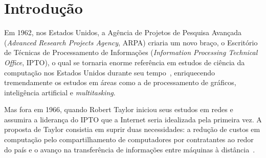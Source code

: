 \documentclass[conference]{IEEEtran}
\begin{document}

\section{Introdução}
  Em 1962, nos Estados Unidos, a Agência de Projetos de Pesquisa Avançada (\emph{Advanced Research Projects Agency}, ARPA) criaria um novo
  braço, o Escritório de Técnicas de Processamento de Informações
  (\emph{Information Processing Technical Office}, IPTO), o qual se
  tornaria enorme referência em estudos de ciência da computação nos Estados
  Unidos durante seu tempo~\cite{fromarpanet}, enriquecendo tremendamente os
  estudos em áreas como a de processamento de gráficos, inteligência artificial e
  \emph{multitasking}.

  Mas fora em 1966, quando Robert Taylor iniciou seus estudos em redes e assumira a liderança do IPTO que a Internet seria idealizada pela primeira vez. A proposta de Taylor consistia em suprir duas necessidades: a redução de custos em computação pelo compartilhamento de computadores por contratantes ao redor do país e o avanço na transferência de informações entre máquinas à distância~\cite{fromarpanet}.
\end{document}
